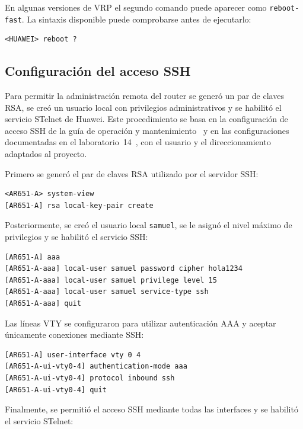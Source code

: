 En algunas versiones de VRP el segundo comando puede aparecer como
\texttt{reboot-fast}. La sintaxis disponible puede comprobarse antes de
ejecutarlo:

\begin{lstlisting}[style=terminal]
<HUAWEI> reboot ?
\end{lstlisting}


\subsection{Configuración del acceso SSH}

Para permitir la administración remota del router se generó un par de claves
RSA, se creó un usuario local con privilegios administrativos y se habilitó
el servicio STelnet de Huawei. Este procedimiento se basa en la configuración
de acceso SSH de la guía de operación y mantenimiento~\cite[sec.~1.4.2, paso~3]{huawei-om-automatico}
y en las configuraciones documentadas en el laboratorio~14~\cite[pp.~2--7]{lab14-ospf-ssh-paramiko},
con el usuario y el direccionamiento adaptados al proyecto.

Primero se generó el par de claves RSA utilizado por el servidor SSH:

\begin{lstlisting}[style=terminal]
<AR651-A> system-view
[AR651-A] rsa local-key-pair create
\end{lstlisting}

Posteriormente, se creó el usuario local \texttt{samuel}, se le asignó el
nivel máximo de privilegios y se habilitó el servicio SSH:

\begin{lstlisting}[style=terminal]
[AR651-A] aaa
[AR651-A-aaa] local-user samuel password cipher hola1234
[AR651-A-aaa] local-user samuel privilege level 15
[AR651-A-aaa] local-user samuel service-type ssh
[AR651-A-aaa] quit
\end{lstlisting}

Las líneas VTY se configuraron para utilizar autenticación AAA y aceptar
únicamente conexiones mediante SSH:

\begin{lstlisting}[style=terminal]
[AR651-A] user-interface vty 0 4
[AR651-A-ui-vty0-4] authentication-mode aaa
[AR651-A-ui-vty0-4] protocol inbound ssh
[AR651-A-ui-vty0-4] quit
\end{lstlisting}

Finalmente, se permitió el acceso SSH mediante todas las interfaces y se
habilitó el servicio STelnet:

